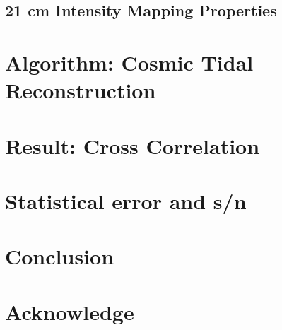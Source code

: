 \documentclass[aps,prd,twocolumn,showpacs,superscriptaddress,groupedaddress,nofootinbib]{revtex4}  %
\begin{document}
\subsection{21 cm Intensity Mapping Properties} 

%
%
\section{Algorithm: Cosmic Tidal Reconstruction}

\section{Result: Cross Correlation}

%
%
\section{Statistical error and s/n}

\section{Conclusion}

\section{Acknowledge}

%


\end{document}
